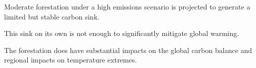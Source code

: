 \documentclass[draft]{agujournal2019}
\begin{document}








\begin{keypoints}
\item Moderate forestation under a high emissions scenario is projected to generate a limited but stable carbon sink.
\item This sink on its own is not enough to significantly mitigate global warming.
\item The forestation does have substantial impacts on the global carbon balance and  regional impacts on temperature extremes.
\end{keypoints}

%
%

%
%
\end{document}
